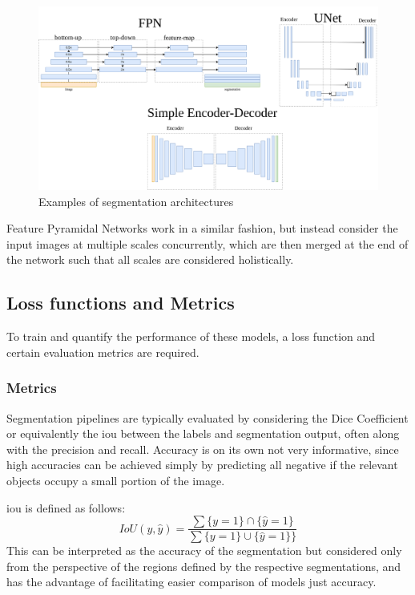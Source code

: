     \begin{figure}[h!]
        \centering
        \includegraphics[width=\linewidth]{illustrations/segmentation_models.png}
        \caption{Examples of segmentation architectures}
        \label{fig:model_expl}
    \end{figure}
    
    Feature Pyramidal Networks work in a similar fashion, but instead consider the input images at multiple scales concurrently, which are then merged at the end of the network such that all scales are considered holistically. 
    
    \subsection{Loss functions and Metrics}
    To train and quantify the performance of these models, a loss function and certain evaluation metrics are required. 
    
    \subsubsection{Metrics}
        Segmentation pipelines are typically evaluated by considering the Dice Coefficient or equivalently the \gls{iou} between the labels and segmentation output, often along with the precision and recall. Accuracy is on its own not very informative, since high accuracies can be achieved simply by predicting all negative if the relevant objects occupy a small portion of the image.
        
        \gls{iou} is defined as follows:
        \begin{equation*}
            IoU(y, \hat{y}) = \frac{\sum \{y=1\}\cap\{\hat{y}=1\} }{\sum \{y=1\} \cup \{\hat{y}=1\}\}}
        \end{equation*}
        This can be interpreted as the accuracy of the segmentation but considered only from the perspective of the regions defined by the respective segmentations, and has the advantage of facilitating easier comparison of models just accuracy.
        
